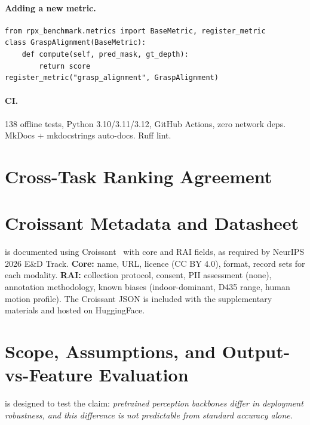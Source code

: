 \paragraph{Adding a new metric.}
\begin{verbatim}
from rpx_benchmark.metrics import BaseMetric, register_metric
class GraspAlignment(BaseMetric):
    def compute(self, pred_mask, gt_depth):
        return score
register_metric("grasp_alignment", GraspAlignment)
\end{verbatim}

\paragraph{CI.} 138 offline tests, Python 3.10/3.11/3.12, GitHub Actions, zero network deps.
MkDocs + mkdocstrings auto-docs. Ruff lint.


\section{Cross-Task Ranking Agreement}
\label{sec:appendix-cross-task}



\section{Croissant Metadata and Datasheet}
\label{sec:appendix-croissant}

\coolname{} is documented using Croissant~\citep{akhtar2024croissant} with core and RAI fields, as required by NeurIPS 2026 E\&D Track.
\textbf{Core:} name, URL, licence (CC BY 4.0), format, record sets for each modality.
\textbf{RAI:} collection protocol, consent, PII assessment (none), annotation methodology, known biases (indoor-dominant, D435 range, human motion profile).
The Croissant JSON is included with the supplementary materials and hosted on HuggingFace.

\section{Scope, Assumptions, and Output-vs-Feature Evaluation}
\label{sec:appendix-scope}

\coolname{} is designed to test the claim: \textit{pretrained perception backbones differ in deployment robustness, and this difference is not predictable from standard accuracy alone.}

